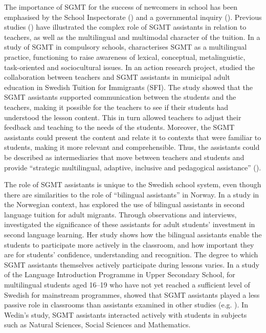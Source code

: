 \documentclass[output=paper]{langscibook}
\begin{document}
The importance of SGMT for the success of newcomers in school has been emphasised by the School Inspectorate (\citealt{Swedish_school_inspectorate2017}) and a governmental inquiry (\citealt{Swedish_ministry_of_education2019}). Previous studies (\citealt{Rosen2019-1, Rosen2020, St_john2021}) have illustrated the complex role of SGMT assistants in relation to teachers, as well as the multilingual and multimodal character of the tuition. In a study of SGMT in compulsory schools, \citet{Reath_warren2017} characterises SGMT as a multilingual practice, functioning to raise awareness of lexical, conceptual, metalinguistic, task-oriented and sociocultural issues. In an action research project, \citet{St_john2021} studied the collaboration between teachers and SGMT assistants in municipal adult education in Swedish Tuition for Immigrants (SFI). The study showed that the SGMT assistants supported communication between the students and the teachers, making it possible for the teachers to see if their students had understood the lesson content. This in turn allowed teachers to adjust their feedback and teaching to the needs of the students. Moreover, the SGMT assistants could present the content and relate it to contexts that were familiar to students, making it more relevant and comprehensible. Thus, the assistants could be described as intermediaries that move between teachers and students and provide “strategic multilingual, adaptive, inclusive and pedagogical assistance” (\citealt[230]{St_john2021}).

The role of SGMT assistants is unique to the Swedish school system, even though there are similarities to the role of “bilingual assistants” in Norway.  In a study in the Norwegian context, \citet{Eek2021} has explored the use of bilingual assistants in second language tuition for adult migrants. Through observations and interviews, \citet{Eek2021} investigated the significance of these assistants for adult students’ investment in second language learning. Her study shows how the bilingual assistants enable the students to participate more actively in the classroom, and how important they are for students’ confidence, understanding and recognition. The degree to which SGMT assistants themselves actively participate during lessons varies. In a study of the Language Introduction Programme in Upper Secondary School, for multilingual students aged 16--19 who have not yet reached a sufficient level of Swedish for mainstream programmes, \citet{Wedin2022} showed that SGMT assistants played a less passive role in classrooms than assistants examined in other studies (e.g. \citealt{Rosen2019-1, Rosen2020}). In Wedin’s study, SGMT assistants interacted actively with students in subjects such as Natural Sciences, Social Sciences and Mathematics.
\end{document}
